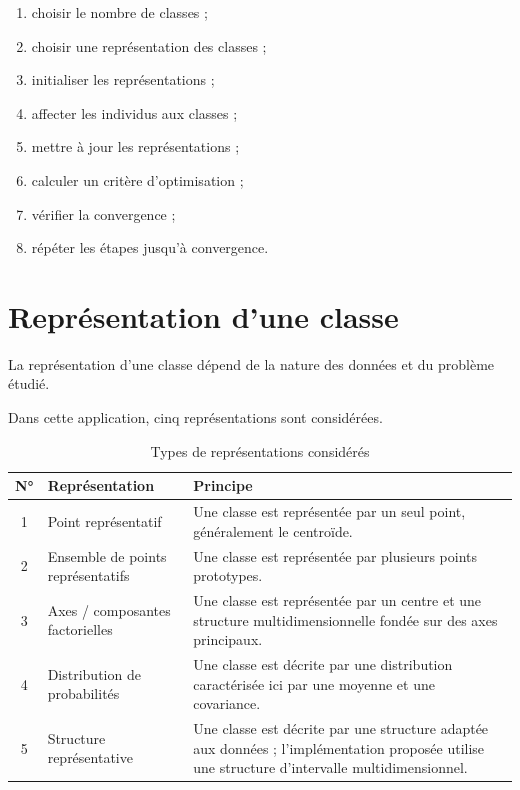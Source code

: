 \documentclass[12pt,a4paper]{report}
\begin{document}
\begin{enumerate}
    \item choisir le nombre de classes ;
    \item choisir une représentation des classes ;
    \item initialiser les représentations ;
    \item affecter les individus aux classes ;
    \item mettre à jour les représentations ;
    \item calculer un critère d'optimisation ;
    \item vérifier la convergence ;
    \item répéter les étapes jusqu'à convergence.
\end{enumerate}

\section{Représentation d'une classe}

La représentation d'une classe dépend de la nature des données et du
problème étudié.

Dans cette application, cinq représentations sont considérées.

\begin{table}[H]
\centering
\caption{Types de représentations considérés}
\label{tab:representations}
\begin{tabular}{|c|l|p{8cm}|}
\hline
\textbf{N°} & \textbf{Représentation} & \textbf{Principe} \\
\hline
1 & Point représentatif &
Une classe est représentée par un seul point, généralement le centroïde. \\
\hline
2 & Ensemble de points représentatifs &
Une classe est représentée par plusieurs points prototypes. \\
\hline
3 & Axes / composantes factorielles &
Une classe est représentée par un centre et une structure multidimensionnelle fondée sur des axes principaux. \\
\hline
4 & Distribution de probabilités &
Une classe est décrite par une distribution caractérisée ici par une moyenne et une covariance. \\
\hline
5 & Structure représentative &
Une classe est décrite par une structure adaptée aux données ; l'implémentation proposée utilise une structure d'intervalle multidimensionnel. \\
\hline
\end{tabular}
\end{table}
\end{document}
